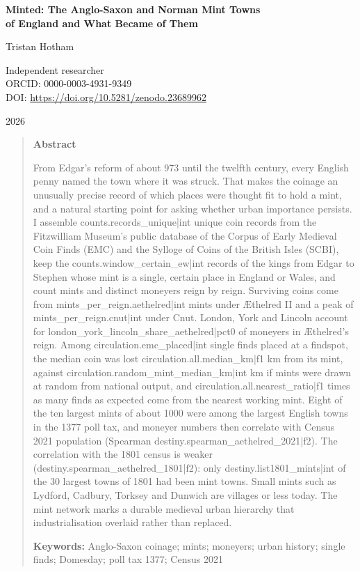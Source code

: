 \documentclass[11pt,a4paper]{article}
\begin{document}
\begin{center}
{\Large\bfseries Minted: The Anglo-Saxon and Norman Mint Towns\\[2pt] of England and What Became of Them\par}
\vspace{1.2em}
{\large Tristan Hotham\par}
\vspace{0.3em}
{\small Independent researcher\\
ORCID: 0000-0003-4931-9349\\
DOI: \href{https://doi.org/10.5281/zenodo.23689962}{https://doi.org/10.5281/zenodo.23689962}\par}
\vspace{0.8em}
2026
\end{center}

\begin{quote}
\small
\begin{center}\textbf{Abstract}\end{center}
From Edgar's reform of about 973 until the twelfth century, every English penny named the town where it was struck. That makes the coinage an unusually precise record of which places were thought fit to hold a mint, and a natural starting point for asking whether urban importance persists. I assemble {{counts.records_unique|int}} unique coin records from the Fitzwilliam Museum's public database of the Corpus of Early Medieval Coin Finds (EMC) and the Sylloge of Coins of the British Isles (SCBI), keep the {{counts.window_certain_ew|int}} records of the kings from Edgar to Stephen whose mint is a single, certain place in England or Wales, and count mints and distinct moneyers reign by reign. Surviving coins come from {{mints_per_reign.aethelred|int}} mints under Æthelred II and a peak of {{mints_per_reign.cnut|int}} under Cnut. London, York and Lincoln account for {{london_york_lincoln_share_aethelred|pct0}} of moneyers in Æthelred's reign. Among {{circulation.emc_placed|int}} single finds placed at a findspot, the median coin was lost {{circulation.all.median_km|f1}} km from its mint, against {{circulation.random_mint_median_km|int}} km if mints were drawn at random from national output, and {{circulation.all.nearest_ratio|f1}} times as many finds as expected come from the nearest working mint. Eight of the ten largest mints of about 1000 were among the largest English towns in the 1377 poll tax, and moneyer numbers then correlate with Census 2021 population (Spearman {{destiny.spearman_aethelred_2021|f2}}). The correlation with the 1801 census is weaker ({{destiny.spearman_aethelred_1801|f2}}): only {{destiny.list1801_mints|int}} of the 30 largest towns of 1801 had been mint towns. Small mints such as Lydford, Cadbury, Torksey and Dunwich are villages or less today. The mint network marks a durable medieval urban hierarchy that industrialisation overlaid rather than replaced.

\textbf{Keywords:} Anglo-Saxon coinage; mints; moneyers; urban history; single finds; Domesday; poll tax 1377; Census 2021
\end{quote}
\end{document}
